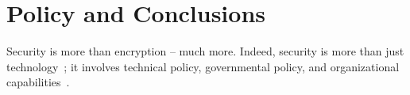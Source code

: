 \section{Policy and Conclusions}



Security is more than encryption -- much more.  Indeed, security is
more than just technology~\cite{bishop2002art}; it involves technical
policy, governmental policy, and organizational
capabilities~\cite{clarke2019fifth}.

